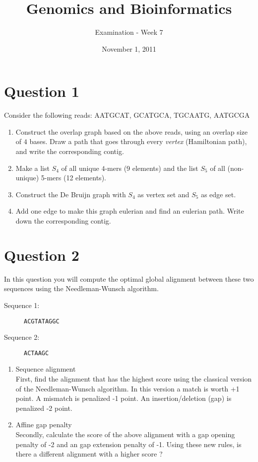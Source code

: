 \documentclass[a4paper,11pt]{article}
\title{Genomics and Bioinformatics}
\date{November 1, 2011}
\author{Examination - Week 7}
\begin{document}
\maketitle

\section*{Question 1}

Consider the following reads:
AATGCAT, GCATGCA, TGCAATG, AATGCGA

\begin{enumerate}
\item Construct the overlap graph based on the above reads, using an
  overlap size of $4$ bases.
  Draw a path that goes
  through every \emph{vertex} (Hamiltonian path), and write the
  corresponding contig. 
\item Make a list $S_4$ of all unique $4$-mers (9 elements) and the
  list $S_5$ of all (non-unique) 5-mers (12 elements). 
\item Construct the De Bruijn graph with $S_4$ as vertex set and
  $S_5$ as edge set.
\item Add one edge to make this graph eulerian and find an eulerian path.
  Write down the corresponding contig. 
\end{enumerate}

\section*{Question 2}
In this question you will compute the optimal global alignment between
these two sequences using the Needleman-Wunsch algorithm. 

\begin{description}
\item[Sequence 1:] \texttt{ACGTATAGGC}
\item[Sequence 2:] \texttt{ACTAAGC}
\end{description}

\begin{enumerate}
\item Sequence alignment\\
First, find the alignment that has the highest score using the
classical version of the Needleman-Wunsch algorithm. In this version a
match is worth +1 point. A mismatch is penalized -1 point. An
insertion/deletion (gap) is penalized -2 point. 
\item Affine gap penalty\\
Secondly, calculate the score of the above alignment with a gap
opening penalty of -2 and an gap extension penalty of -1. Using these
new rules, is there a different alignment with a higher score ?
\end{enumerate}
\end{document}
